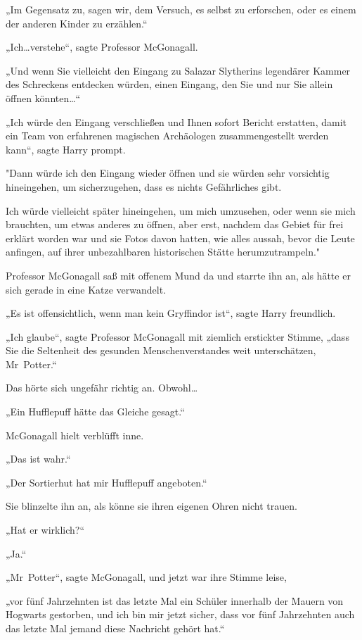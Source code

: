 {„Im Gegensatz zu, sagen wir, dem Versuch, es selbst zu erforschen, oder es einem der anderen Kinder zu erzählen.“

„Ich…verstehe“, sagte Professor McGonagall.

„Und wenn Sie vielleicht den Eingang zu Salazar Slytherins legendärer Kammer des Schreckens entdecken würden, einen Eingang, den Sie und nur Sie allein öffnen könnten…“

„Ich würde den Eingang verschließen und Ihnen sofort Bericht erstatten, damit ein Team von erfahrenen magischen Archäologen zusammengestellt werden kann“, sagte Harry prompt.

"Dann würde ich den Eingang wieder öffnen und sie würden sehr vorsichtig hineingehen, um sicherzugehen, dass es nichts Gefährliches gibt.

Ich würde vielleicht später hineingehen, um mich umzusehen, oder wenn sie mich brauchten, um etwas anderes zu öffnen, aber erst, nachdem das Gebiet für frei erklärt worden war und sie Fotos davon hatten, wie alles aussah, bevor die Leute anfingen, auf ihrer unbezahlbaren historischen Stätte herumzutrampeln."

Professor McGonagall saß mit offenem Mund da und starrte ihn an, als hätte er sich gerade in eine Katze verwandelt.

„Es ist offensichtlich, wenn man kein Gryffindor ist“, sagte Harry freundlich.

„Ich glaube“, sagte Professor McGonagall mit ziemlich erstickter Stimme, „dass Sie die Seltenheit des gesunden Menschenverstandes weit unterschätzen, Mr~Potter.“

Das hörte sich ungefähr richtig an. Obwohl…

„Ein Hufflepuff hätte das Gleiche gesagt.“

McGonagall hielt verblüfft inne.

„Das ist wahr.“

„Der Sortierhut hat mir Hufflepuff angeboten.“

Sie blinzelte ihn an, als könne sie ihren eigenen Ohren nicht trauen.

„Hat er wirklich?“

„Ja.“

„Mr~Potter“, sagte McGonagall, und jetzt war ihre Stimme leise,

„vor fünf Jahrzehnten ist das letzte Mal ein Schüler innerhalb der Mauern von Hogwarts gestorben, und ich bin mir jetzt sicher, dass vor fünf Jahrzehnten auch das letzte Mal jemand diese Nachricht gehört hat.“

}
